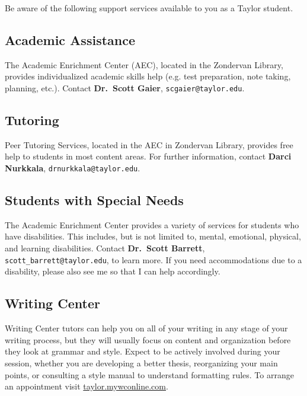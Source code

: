Be aware of the following support services
available to you as a Taylor student.

\subsection{Academic Assistance}

The Academic Enrichment Center (AEC), located in the Zondervan Library,
provides individualized academic skills help
(e.g. test preparation, note taking, planning, etc.).
Contact \textbf{Dr.\ Scott Gaier}, \texttt{scgaier@taylor.edu}.
 
\subsection{Tutoring}

Peer Tutoring Services,
located in the AEC in Zondervan Library,
provides free help to students in most content areas.
For further information, contact
\textbf{Darci Nurkkala}, \texttt{drnurkkala@taylor.edu}.

\subsection{Students with Special Needs}

The Academic Enrichment Center provides a variety of services
for students who have disabilities.
This includes, but is not limited to, mental, emotional, physical, and learning disabilities.
Contact \textbf{Dr.\ Scott Barrett}, \texttt{scott\_barrett@taylor.edu}, to learn more.
If you need accommodations due to a disability,
please also see me so that I can help accordingly.

\subsection{Writing Center}

Writing Center tutors can help you on all of your writing
in any stage of your writing process,
but they will usually focus on content and organization
before they look at grammar and style.
Expect to be actively involved during your session,
whether you are developing a better thesis,
reorganizing your main points,
or consulting a style manual to understand formatting rules.
To arrange an appointment visit \url{taylor.mywconline.com}. 

